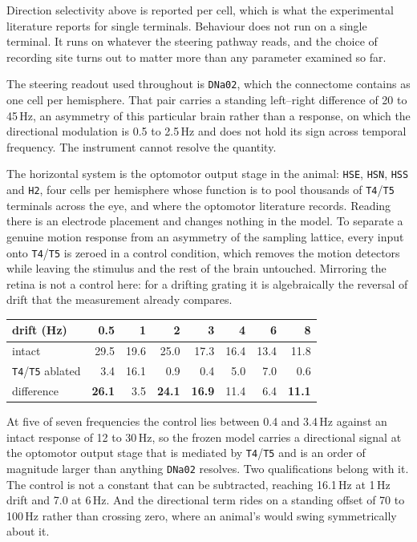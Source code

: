\documentclass[10pt,twoside]{article}
\newcommand{\cell}[1]{\texttt{#1}}
\begin{document}
Direction selectivity above is reported per cell, which is what the
experimental literature reports for single terminals. Behaviour does not run
on a single terminal. It runs on whatever the steering pathway reads, and the
choice of recording site turns out to matter more than any parameter examined
so far.

The steering readout used throughout is \cell{DNa02}, which the connectome
contains as one cell per hemisphere. That pair carries a standing left--right
difference of 20 to 45\,Hz, an asymmetry of this particular brain rather than
a response, on which the directional modulation is 0.5 to 2.5\,Hz and does not
hold its sign across temporal frequency. The instrument cannot resolve the
quantity.

The horizontal system is the optomotor output stage in the animal:
\cell{HSE}, \cell{HSN}, \cell{HSS} and \cell{H2}, four cells per hemisphere
whose function is to pool thousands of \cell{T4}/\cell{T5} terminals across
the eye, and where the optomotor literature records. Reading there is an
electrode placement and changes nothing in the model. To separate a genuine
motion response from an asymmetry of the sampling lattice, every input onto
\cell{T4}/\cell{T5} is zeroed in a control condition, which removes the motion
detectors while leaving the stimulus and the rest of the brain untouched.
Mirroring the retina is not a control here: for a drifting grating it is
algebraically the reversal of drift that the measurement already compares.

\begin{center}
\small
\begin{tabular}{lrrrrrrr}
\toprule
drift (Hz) & 0.5 & 1 & 2 & 3 & 4 & 6 & 8\\
\midrule
intact & 29.5 & 19.6 & 25.0 & 17.3 & 16.4 & 13.4 & 11.8\\
\cell{T4}/\cell{T5} ablated & 3.4 & 16.1 & 0.9 & 0.4 & 5.0 & 7.0 & 0.6\\
difference & \textbf{26.1} & 3.5 & \textbf{24.1} & \textbf{16.9} & 11.4 & 6.4 &
\textbf{11.1}\\
\bottomrule
\end{tabular}
\end{center}

At five of seven frequencies the control lies between 0.4 and 3.4\,Hz against
an intact response of 12 to 30\,Hz, so the frozen model carries a directional
signal at the optomotor output stage that is mediated by \cell{T4}/\cell{T5}
and is an order of magnitude larger than anything \cell{DNa02} resolves. Two
qualifications belong with it. The control is not a constant that can be
subtracted, reaching 16.1\,Hz at 1\,Hz drift and 7.0 at 6\,Hz. And the
directional term rides on a standing offset of 70 to 100\,Hz rather than
crossing zero, where an animal's would swing symmetrically about it.
\end{document}
